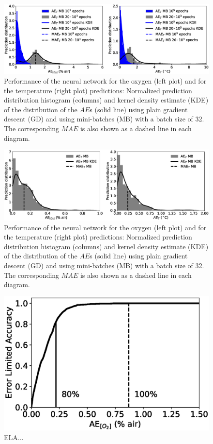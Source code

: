 \documentclass[9pt,twocolumn,twoside,pdftex]{optica}
\begin{document}
\begin{figure}[htbp]
\centering
\includegraphics[width=17 cm]{comparison_theta90_20k_vs_100k.eps}
\caption{Performance of the neural network for the oxygen (left plot) and for the temperature (right plot) predictions: Normalized prediction distribution histogram (columns) and kernel density estimate (KDE) of the distribution of the $AE$s (solid line) using plain gradient descent (GD) and using mini-batches (MB) with a batch size of 32. The corresponding $MAE$ is also shown as a dashed line in each diagram.}
\label{fig:prediction_distribution_epochs_90}
\end{figure}

\begin{figure}[htbp]
\centering
\includegraphics[width=17 cm]{theta_theta0_mb_20k.eps}
\caption{Performance of the neural network for the oxygen (left plot) and for the temperature (right plot) predictions: Normalized prediction distribution histogram (columns) and kernel density estimate (KDE) of the distribution of the $AE$s (solid line) using plain gradient descent (GD) and using mini-batches (MB) with a batch size of 32. The corresponding $MAE$ is also shown as a dashed line in each diagram.}
\label{fig:prediction_distribution_theta0}
\end{figure}

\begin{figure}[htbp]
\centering
\includegraphics[width=7 cm]{ELA_model_20001_32_1e-3_3x50_2x5_2x5_theta_theta0.eps}
\caption{ELA...}
\label{fig:result_theta0}
\end{figure}
\end{document}

